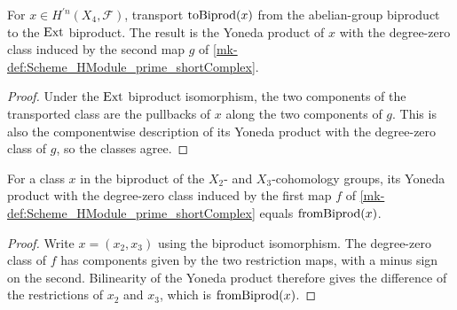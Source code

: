 \begin{lemma}\label{mk-lem:Scheme_HModule_prime_biprodAddEquiv_symm_biprodIsoProd_hom_toBiprod_apply}
  \leanok


  For \(x\in H^{\prime n}(X_4,\mathcal F)\), transport \(\operatorname{toBiprod}(x)\) from the abelian-group biproduct to the \(\operatorname{Ext}\) biproduct. The result is the Yoneda product of \(x\) with the degree-zero class induced by the second map \(g\) of \ref{mk-def:Scheme_HModule_prime_shortComplex}.
\end{lemma}

\begin{proof}
  \leanok

  Under the \(\operatorname{Ext}\) biproduct isomorphism, the two components of the transported class are the pullbacks of \(x\) along the two components of \(g\). This is also the componentwise description of its Yoneda product with the degree-zero class of \(g\), so the classes agree.
\end{proof}

\begin{lemma}\label{mk-lem:Scheme_HModule_prime_mk_zero_f_comp_biprodAddEquiv_symm_biprodIsoProd_hom}
  \leanok


  For a class \(x\) in the biproduct of the \(X_2\)- and \(X_3\)-cohomology groups, its Yoneda product with the degree-zero class induced by the first map \(f\) of \ref{mk-def:Scheme_HModule_prime_shortComplex} equals \(\operatorname{fromBiprod}(x)\).
\end{lemma}

\begin{proof}
  \leanok

  Write \(x=(x_2,x_3)\) using the biproduct isomorphism. The degree-zero class of \(f\) has components given by the two restriction maps, with a minus sign on the second. Bilinearity of the Yoneda product therefore gives the difference of the restrictions of \(x_2\) and \(x_3\), which is \(\operatorname{fromBiprod}(x)\).
\end{proof}

